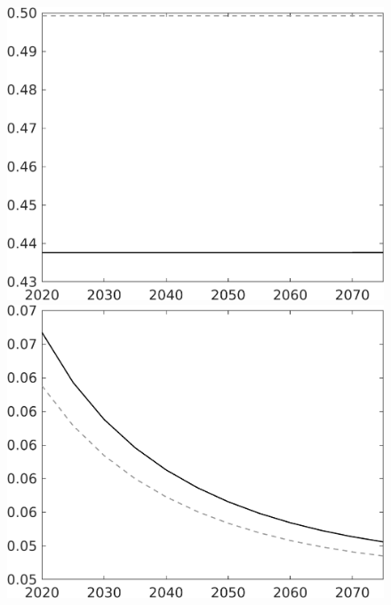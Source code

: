 \begin{figure}[h!!]
\begin{minipage}[]{0.32\textwidth}
	\end{minipage}	
	\begin{minipage}[]{0.32\textwidth}
		\includegraphics[width=1\textwidth]{../../codding_model/own_basedOnFried/optimalPol_010922_revision/figures/all_13Sept22/CompTaul_Reg0_hh_spillover0_nsk0_xgr0_sep1_LFlimit0_emsbase1_countec0_GovRev1_etaa0.79_lgd0.png}
	\end{minipage}	
	\begin{minipage}[]{0.32\textwidth}
		\includegraphics[width=1\textwidth]{../../codding_model/own_basedOnFried/optimalPol_010922_revision/figures/all_13Sept22/CompTaul_Reg0_sff_spillover0_nsk0_xgr0_sep1_LFlimit0_emsbase1_countec0_GovRev1_etaa0.79_lgd0.png}

\end{minipage}
\end{figure}

